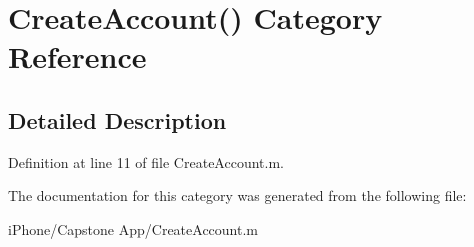 \hypertarget{category_create_account_07_08}{\section{Create\-Account() Category Reference}
\label{category_create_account_07_08}
}


\subsection{Detailed Description}


Definition at line 11 of file Create\-Account.\-m.



The documentation for this category was generated from the following file\-:\begin{DoxyCompactItemize}
\item 
i\-Phone/\-Capstone App/Create\-Account.\-m\end{DoxyCompactItemize}
